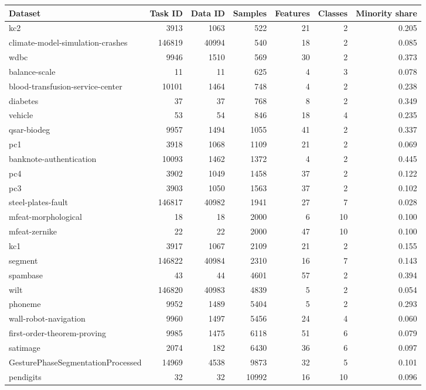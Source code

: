 \begin{tabular}{lrrrrrr}
\hline
Dataset & Task ID & Data ID & Samples & Features & Classes & Minority share \\
\hline
kc2 & 3913 & 1063 & 522 & 21 & 2 & 0.205 \\
climate-model-simulation-crashes & 146819 & 40994 & 540 & 18 & 2 & 0.085 \\
wdbc & 9946 & 1510 & 569 & 30 & 2 & 0.373 \\
balance-scale & 11 & 11 & 625 & 4 & 3 & 0.078 \\
blood-transfusion-service-center & 10101 & 1464 & 748 & 4 & 2 & 0.238 \\
diabetes & 37 & 37 & 768 & 8 & 2 & 0.349 \\
vehicle & 53 & 54 & 846 & 18 & 4 & 0.235 \\
qsar-biodeg & 9957 & 1494 & 1055 & 41 & 2 & 0.337 \\
pc1 & 3918 & 1068 & 1109 & 21 & 2 & 0.069 \\
banknote-authentication & 10093 & 1462 & 1372 & 4 & 2 & 0.445 \\
pc4 & 3902 & 1049 & 1458 & 37 & 2 & 0.122 \\
pc3 & 3903 & 1050 & 1563 & 37 & 2 & 0.102 \\
steel-plates-fault & 146817 & 40982 & 1941 & 27 & 7 & 0.028 \\
mfeat-morphological & 18 & 18 & 2000 & 6 & 10 & 0.100 \\
mfeat-zernike & 22 & 22 & 2000 & 47 & 10 & 0.100 \\
kc1 & 3917 & 1067 & 2109 & 21 & 2 & 0.155 \\
segment & 146822 & 40984 & 2310 & 16 & 7 & 0.143 \\
spambase & 43 & 44 & 4601 & 57 & 2 & 0.394 \\
wilt & 146820 & 40983 & 4839 & 5 & 2 & 0.054 \\
phoneme & 9952 & 1489 & 5404 & 5 & 2 & 0.293 \\
wall-robot-navigation & 9960 & 1497 & 5456 & 24 & 4 & 0.060 \\
first-order-theorem-proving & 9985 & 1475 & 6118 & 51 & 6 & 0.079 \\
satimage & 2074 & 182 & 6430 & 36 & 6 & 0.097 \\
GesturePhaseSegmentationProcessed & 14969 & 4538 & 9873 & 32 & 5 & 0.101 \\
pendigits & 32 & 32 & 10992 & 16 & 10 & 0.096 \\
\hline
\end{tabular}
